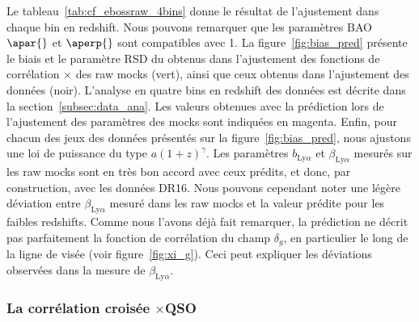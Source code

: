 Le tableau~\ref{tab:cf_ebossraw_4bins} donne le résultat de l'ajustement dans chaque bin en redshift.
Nous pouvons remarquer que les paramètres BAO $\apar{}$ et $\aperp{}$ sont compatibles avec 1.
La figure~\ref{fig:bias_pred} présente le biais et le paramètre RSD du \lya{} obtenus dans l'ajustement des fonctions de corrélation \lya{}$\times$\lya{} des raw mocks (vert), ainsi que ceux obtenus dans l'ajustement des données (noir). 
L'analyse en quatre bins en redshift des données est décrite dans la section~\ref{subsec:data_ana}.
Les valeurs obtenues avec la prédiction lors de l'ajustement des paramètres des mocks sont indiquées en magenta.
Enfin, pour chacun des jeux des données présentés sur la figure~\ref{fig:bias_pred}, nous ajustons une loi de puissance du type $a (1+z)^{\gamma}$.
Les paramètres $b_{\mathrm{Ly}\alpha}$ et $\beta_{\mathrm{Ly}\alpha}$ mesurés sur les raw mocks sont en très bon accord avec ceux prédits, et donc, par construction, avec les données DR16.
Nous pouvons cependant noter une légère déviation entre $\beta_{\mathrm{Ly}\alpha}$ mesuré dans les raw mocks et la valeur prédite pour les faibles redshifts.
Comme nous l'avons déjà fait remarquer, la prédiction ne décrit pas parfaitement la fonction de corrélation du champ $\delta_g$, en particulier le long de la ligne de visée (voir figure~\ref{fig:xi_g}). Ceci peut expliquer les déviations observées dans la mesure de $\beta_{\mathrm{Ly}\alpha}$.



\subsubsection{La corrélation croisée \lya{}$\times$QSO}

